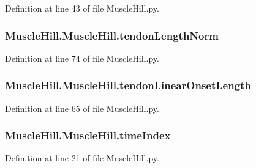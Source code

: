 Definition at line 43 of file Muscle\+Hill.\+py.

\subsubsection[{\texorpdfstring{tendon\+Length\+Norm}{tendonLengthNorm}}]{\setlength{\rightskip}{0pt plus 5cm}Muscle\+Hill.\+Muscle\+Hill.\+tendon\+Length\+Norm}\hypertarget{class_muscle_hill_1_1_muscle_hill_a7e43dbfcf2ffc57b2f8cbb2c01f7b3c3}{}\label{class_muscle_hill_1_1_muscle_hill_a7e43dbfcf2ffc57b2f8cbb2c01f7b3c3}


Definition at line 74 of file Muscle\+Hill.\+py.

\subsubsection[{\texorpdfstring{tendon\+Linear\+Onset\+Length}{tendonLinearOnsetLength}}]{\setlength{\rightskip}{0pt plus 5cm}Muscle\+Hill.\+Muscle\+Hill.\+tendon\+Linear\+Onset\+Length}\hypertarget{class_muscle_hill_1_1_muscle_hill_aa3fa7eedbc4569454c1c1afe95a13088}{}\label{class_muscle_hill_1_1_muscle_hill_aa3fa7eedbc4569454c1c1afe95a13088}


Definition at line 65 of file Muscle\+Hill.\+py.

\subsubsection[{\texorpdfstring{time\+Index}{timeIndex}}]{\setlength{\rightskip}{0pt plus 5cm}Muscle\+Hill.\+Muscle\+Hill.\+time\+Index}\hypertarget{class_muscle_hill_1_1_muscle_hill_ab4e1bd36001e334113d42cb8628b2b1d}{}\label{class_muscle_hill_1_1_muscle_hill_ab4e1bd36001e334113d42cb8628b2b1d}


Definition at line 21 of file Muscle\+Hill.\+py.

